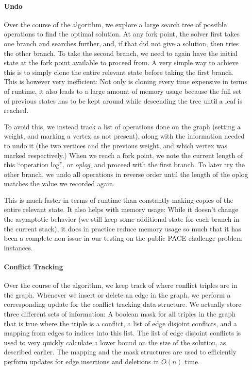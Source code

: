 \documentclass[12pt,oneside,english,parskip=full,headings=small]{scrbook}
\theoremstyle{definition}
\begin{document}
\paragraph{Undo} Over the course of the algorithm, we explore a large search tree of possible
operations to find the optimal solution. At any fork point, the solver first takes one branch and
searches further, and, if that did not give a solution, then tries the other branch. To take the
second branch, we need to again have the initial state at the fork point available to proceed from.
A very simple way to achieve this is to simply clone the entire relevant state before taking the
first branch. This is however very inefficient: Not only is cloning every time expensive in terms of
runtime, it also leads to a large amount of memory usage because the full set of previous states has
to be kept around while descending the tree until a leaf is reached.

To avoid this, we instead track a list of operations done on the graph (setting a weight, and
marking a vertex as not present), along with the information needed to undo it (the two vertices and
the previous weight, and which vertex was marked respectively.) When we reach a fork point, we note
the current length of this ``operation log'', or \emph{oplog}, and proceed with the first branch. To
later try the other branch, we undo all operations in reverse order until the length of the oplog
matches the value we recorded again.

This is much faster in terms of runtime than constantly making copies of the entire relevant state.
It also helps with memory usage: While it doesn't change the asymptotic behavior (we still keep
some additional state for each branch in the current stack), it does in practice reduce memory usage
so much that it has been a complete non-issue in our testing on the public PACE challenge problem
instances.

\paragraph{Conflict Tracking} Over the course of the algorithm, we keep track of where conflict
triples are in the graph. Whenever we insert or delete an edge in the graph, we perform a
corresponding update for the conflict tracking data structure. We actually store three different
sets of information: A boolean mask for all triples in the graph that is true where the triple is a
conflict, a list of edge disjoint conflicts, and a mapping from edges to indices into this list.
The list of edge disjoint conflicts is used to very quickly calculate a lower bound on the size of
the solution, as described earlier. The mapping and the mask structures are used to efficiently
perform updates for edge insertions and deletions in $O(n)$ time.
\end{document}

